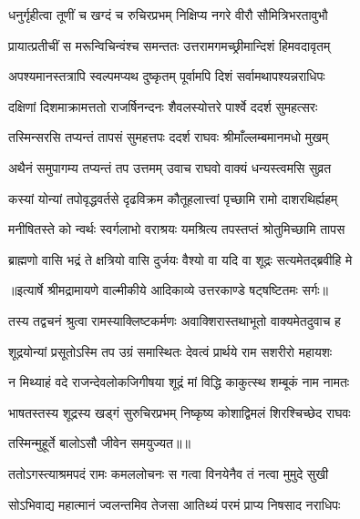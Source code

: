 \twolineshloka
{धनुर्गृहीत्वा तूणीं च खग्दं च रुचिरप्रभम्}
{निक्षिप्य नगरे वीरौ सौमित्रिभरतावुभौ} %

\twolineshloka
{प्रायात्प्रतीचीं स मरून्विचिन्वंश्च समन्ततः}
{उत्तरामगमच्छ्रीमान्दिशं हिमवदावृतम्} %

\twolineshloka
{अपश्यमानस्तत्रापि स्वल्पमप्यथ दुष्कृतम्}
{पूर्वामपि दिशं सर्वामथापश्यन्नराधिपः} %

\twolineshloka
{दक्षिणां दिशमाक्रामत्ततो राजर्षिनन्दनः}
{शैवलस्योत्तरे पार्श्वे ददर्श सुमहत्सरः} %

\twolineshloka
{तस्मिन्सरसि तप्यन्तं तापसं सुमहत्तपः}
{ददर्श राघवः श्रीमाँल्लम्बमानमधो मुखम्} %

\twolineshloka
{अथैनं समुपागम्य तप्यन्तं तप उत्तमम्}
{उवाच राघवो वाक्यं धन्यस्त्वमसि सुव्रत} %

\twolineshloka
{कस्यां योन्यां तपोवृद्धवर्तसे दृढविक्रम}
{कौतूहलात्त्वां पृच्छामि रामो दाशरथिर्ह्यहम्} %

\twolineshloka
{मनीषितस्ते को न्वर्थः स्वर्गलाभो वराश्रयः}
{यमश्रित्य तपस्तप्तं श्रोतुमिच्छामि तापस} %

\twolineshloka
{ब्राह्मणो वासि भद्रं ते क्षत्रियो वासि दुर्जयः}
{वैश्यो वा यदि वा शूद्रः सत्यमेतद्ब्रवीहि मे} %


{॥इत्यार्षे श्रीमद्रामायणे वाल्मीकीये आदिकाव्ये उत्तरकाण्डे षट्षष्टितमः सर्गः॥}


\twolineshloka
{तस्य तद्वचनं श्रुत्वा रामस्याक्लिष्टकर्मणः}
{अवाक्शिरास्तथाभूतो वाक्यमेतदुवाच ह} %

\twolineshloka
{शूद्रयोन्यां प्रसूतोऽस्मि तप उग्रं समास्थितः}
{देवत्वं प्रार्थये राम सशरीरो महायशः} %

\twolineshloka
{न मिथ्याहं वदे राजन्देवलोकजिगीषया}
{शूद्रं मां विद्धि काकुत्स्थ शम्बूकं नाम नामतः} %

\twolineshloka
{भाषतस्तस्य शूद्रस्य खड्गं सुरुचिरप्रभम्}
{निष्कृष्य कोशाद्विमलं शिरश्चिच्छेद राघवः} %

{तस्मिन्मुहूर्ते बालोऽसौ जीवेन समयुज्यत॥॥} %

\addtocounter{shlokacount}{1}

\twolineshloka
{ततोऽगस्त्याश्रमपदं रामः कमललोचनः}
{स गत्वा विनयेनैव तं नत्वा मुमुदे सुखी} %

\twolineshloka
{सोऽभिवाद्य महात्मानं ज्वलन्तमिव तेजसा}
{आतिथ्यं परमं प्राप्य निषसाद नराधिपः} %


